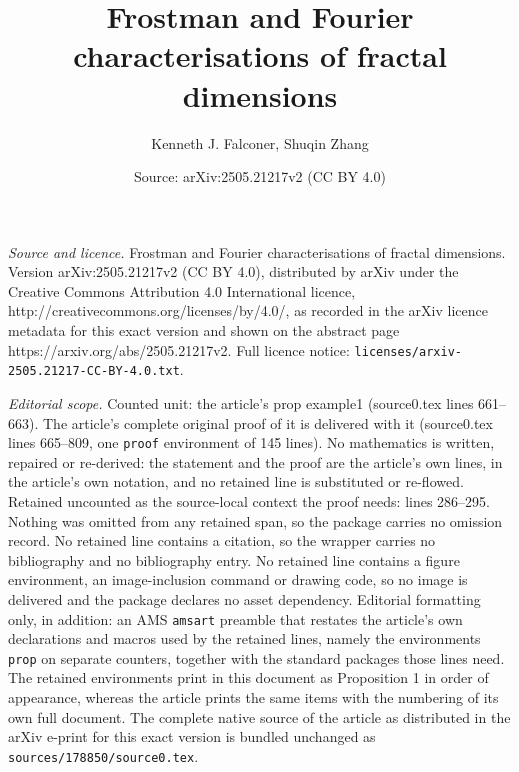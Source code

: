 \documentclass[10pt,a4paper]{amsart}
\title{Frostman and Fourier characterisations of fractal dimensions}
\author{Kenneth J. Falconer, Shuqin Zhang}
\date{Source: arXiv:2505.21217v2 (CC BY 4.0)}
\begin{document}
\maketitle

\noindent\emph{Source and licence.} Frostman and Fourier characterisations of fractal dimensions. Version arXiv:2505.21217v2 (CC BY 4.0), distributed by arXiv under the Creative Commons Attribution 4.0 International licence, http://creativecommons.org/licenses/by/4.0/, as recorded in the arXiv licence metadata for this exact version and shown on the abstract page https://arxiv.org/abs/2505.21217v2. Full licence notice: \texttt{licenses/arxiv-2505.21217-CC-BY-4.0.txt}.\par\smallskip

\noindent\textit{Editorial scope.} Counted unit: the article's prop example1 (source0.tex lines 661--663). The article's complete original proof of it is delivered with it (source0.tex lines 665--809, one \texttt{proof} environment of 145 lines). No mathematics is written, repaired or re-derived: the statement and the proof are the article's own lines, in the article's own notation, and no retained line is substituted or re-flowed.  Retained uncounted as the source-local context the proof needs: lines 286--295.  Nothing was omitted from any retained span, so the package carries no omission record.  No retained line contains a citation, so the wrapper carries no bibliography and no bibliography entry.  No retained line contains a figure environment, an image-inclusion command or drawing code, so no image is delivered and the package declares no asset dependency.  Editorial formatting only, in addition: an AMS \texttt{amsart} preamble that restates the article's own declarations and macros used by the retained lines, namely the environments \texttt{prop} on separate counters, together with the standard packages those lines need.  The retained environments print in this document as Proposition 1 in order of appearance, whereas the article prints the same items with the numbering of its own full document.  The complete native source of the article as distributed in the arXiv e-print for this exact version is bundled unchanged as \texttt{sources/178850/source0.tex}.
\end{document}
